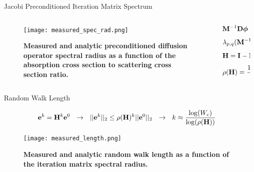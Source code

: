 \documentclass{beamer}
\begin{document}
\begin{frame}{Jacobi Preconditioned Iteration Matrix Spectrum}

  \begin{columns}

    \begin{column}{0.5\textwidth}
      \begin{figure}[t!]
        \begin{center}
          \texttt{[image: measured\_spec\_rad.png]}
        \end{center}
        \caption{\textbf{Measured and analytic preconditioned diffusion
            operator spectral radius as a function of the absorption cross
            section to scattering cross section ratio.}}
      \end{figure}
    \end{column}

    \begin{column}{0.5\textwidth}
      \[
        \mathbf{M}^{-1} \mathbf{D} \boldsymbol{\phi} = \mathbf{M}^{-1} \mathbf{s}
      \]
      \medskip
      \[
        \lambda_{p,q}(\mathbf{M}^{-1} \mathbf{D}) = \alpha \lambda_{p,q}(\mathbf{D})
      \]
      \medskip
      \[
        \mathbf{H} = \mathbf{I} - \mathbf{M}^{-1} \mathbf{D}
      \]
      \medskip
      \[
        \rho(\mathbf{H}) = \frac{10 \alpha D}{3 h^2}
      \]
    \end{column}

  \end{columns}

\end{frame}

\begin{frame}{Random Walk Length}

  \[
  \ve{e}^{k} = \ve{H}^k\ve{e}^0 \ \ \rightarrow \ \ ||\ve{e}^{k}||_2
  \leq \rho(\ve{H})^k ||\ve{e}^0||_2 \ \ \rightarrow \ \ k \approx
  \frac{ \log(W_c) }{ \log( \rho(\ve{H}) ) }
  \]

  \bigskip
  \begin{figure}[t!]
    \begin{center}
      \texttt{[image: measured\_length.png]}
    \end{center}
    \caption{\textbf{Measured and analytic random walk length as a
        function of the iteration matrix spectral radius.}}
  \end{figure}

\end{frame}
\end{document}
